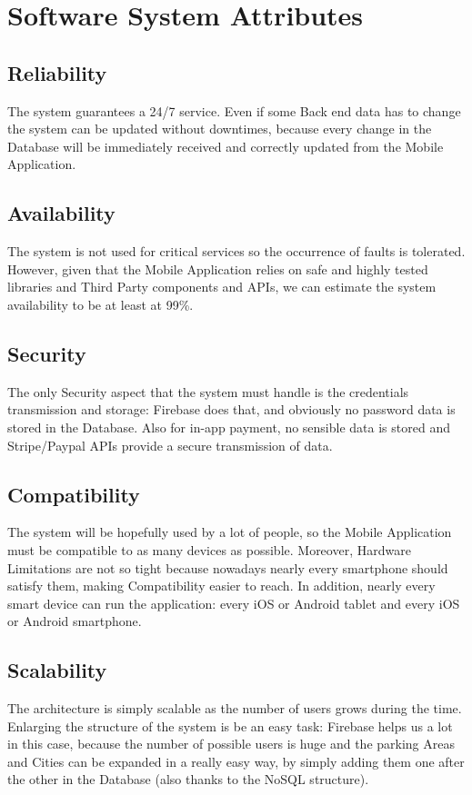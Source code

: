 \documentclass[11pt]{article} %
\begin{document}
\section{Software System Attributes}

\subsection{Reliability}
The system guarantees a 24/7 service. Even if some Back end data has to change the system can be updated without downtimes, because every change in the Database will be immediately received and correctly updated from the Mobile Application.

\subsection{Availability}
The system is not used for critical services so the occurrence of faults is tolerated. However, given that the Mobile Application relies on safe and highly tested libraries and Third Party components and APIs, we can estimate the system availability to be at least at 99\%. 

\subsection{Security}
The only Security aspect that the system must handle is the credentials transmission and storage: Firebase does that, and obviously no password data is stored in the Database. Also for in-app payment, no sensible data is stored and Stripe/Paypal APIs provide a secure transmission of data.

\subsection{Compatibility}
The system will be hopefully used by a lot of people, so the Mobile Application must be compatible to as many devices as possible. Moreover, Hardware Limitations are not so tight because nowadays nearly every smartphone should satisfy them, making Compatibility easier to reach. In addition, nearly every smart device can run the application: every iOS or Android tablet and every iOS or Android smartphone.

\subsection{Scalability}
The architecture is simply scalable as the number of users grows during the time. Enlarging the structure of the system is be an easy task: Firebase helps us a lot in this case, because the number of possible users is huge and the parking Areas and Cities can be expanded in a really easy way, by simply adding them one after the other in the Database (also thanks to the NoSQL structure).
\end{document}
